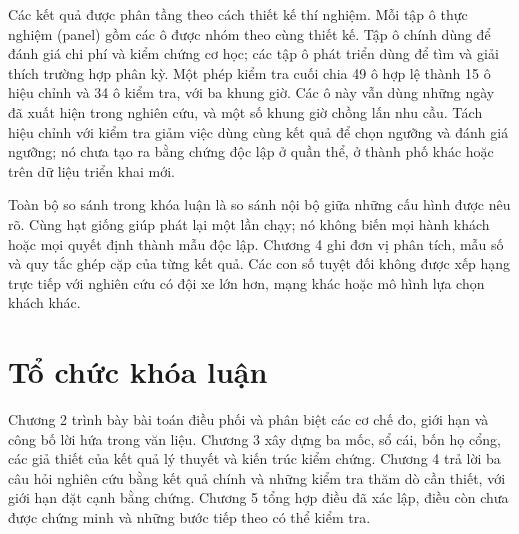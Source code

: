 Các kết quả được phân tầng theo cách thiết kế thí nghiệm. Mỗi tập ô thực nghiệm (panel)
gồm các ô được nhóm theo cùng thiết kế. Tập ô chính dùng để đánh giá chi phí và kiểm chứng
cơ học; các tập ô phát triển dùng để tìm và giải thích trường hợp
phân kỳ. Một phép kiểm tra cuối chia 49 ô hợp lệ thành 15 ô hiệu chỉnh và 34 ô kiểm tra,
với ba khung giờ. Các ô này vẫn dùng những ngày đã xuất hiện trong nghiên cứu, và một số
khung giờ chồng lấn nhu cầu. Tách hiệu chỉnh với kiểm tra giảm việc dùng cùng kết quả để
chọn ngưỡng và đánh giá ngưỡng; nó chưa tạo ra bằng chứng độc lập ở quần thể, ở thành phố
khác hoặc trên dữ liệu triển khai mới.

Toàn bộ so sánh trong khóa luận là so sánh nội bộ giữa những cấu hình được nêu rõ. Cùng
hạt giống giúp phát lại một lần chạy; nó không biến mọi hành khách hoặc mọi quyết định
thành mẫu độc lập. Chương 4 ghi đơn vị phân tích, mẫu số và quy tắc ghép cặp của từng kết
quả. Các con số tuyệt đối không được xếp hạng trực tiếp với nghiên cứu có đội xe lớn hơn,
mạng khác hoặc mô hình lựa chọn khách khác.

\section{Tổ chức khóa luận}

Chương 2 trình bày bài toán điều phối và phân biệt các cơ chế đo, giới hạn và công bố lời
hứa trong văn liệu. Chương 3 xây dựng ba mốc, sổ cái, bốn họ cổng, các giả thiết của kết quả
lý thuyết và kiến trúc kiểm chứng. Chương 4 trả lời ba câu hỏi nghiên cứu bằng kết quả chính
và những kiểm tra thăm dò cần thiết, với giới hạn đặt cạnh bằng chứng. Chương 5 tổng hợp
điều đã xác lập, điều còn chưa được chứng minh và những bước tiếp theo có thể kiểm tra.

